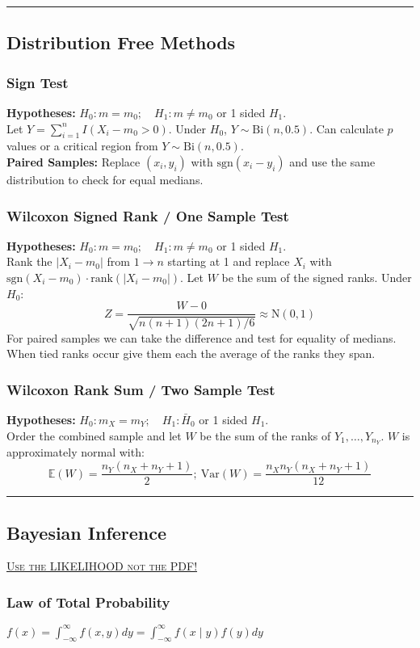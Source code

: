 \documentclass{article}
\begin{document}
\begin{multicols*}{2}
\noindent\rule{\linewidth}{0.25pt}
\subsection*{Distribution Free Methods}
\subsubsection*{Sign Test}
\textbf{Hypotheses:} $H_{0}: m = m_{0}; \quad H_{1}: m \neq m_{0}$ or 1 sided $H_{1}$.\\
Let $Y = \sum_{i=1}^{n} I(X_{i} - m_{0} > 0)$. Under $H_{0}$, $Y \sim \mbox{Bi}(n, 0.5)$. Can calculate $p$ values or a critical region from $Y \sim \mbox{Bi}(n, 0.5)$.\\
\textbf{Paired Samples:} Replace $(x_{i}, y_{i})$ with $\mbox{sgn}(x_{i} - y_{i})$ and use the same distribution to check for equal medians. 
\subsubsection*{Wilcoxon Signed Rank / One Sample Test}
\textbf{Hypotheses:} $H_{0}: m = m_{0}; \quad H_{1}: m \neq m_{0}$ or 1 sided $H_{1}$.\\
Rank the $|X_{i} - m_{0}|$ from $1 \to n$ starting at 1 and replace $X_{i}$ with $\mbox{sgn}(X_{i} - m_{0}) \cdot \mbox{rank}(|X_{i} - m_{0}|)$. Let $W$ be the sum of the signed ranks. Under $H_{0}$:
$$Z = \frac{W - 0}{\sqrt{n(n+1)(2n+1) / 6}} \approx \mbox{N}(0, 1)$$
For paired samples we can take the difference and test for equality of medians. When tied ranks occur give them each the average of the ranks they span.
\subsubsection*{Wilcoxon Rank Sum / Two Sample Test}
\textbf{Hypotheses:} $H_{0}: m_{X} = m_{Y}; \quad H_{1}: \bar{H}_{0}$ or 1 sided $H_{1}$.\\
Order the combined sample and let $W$ be the sum of the ranks of $Y_{1}, \dots, Y_{n_{Y}}$. $W$ is approximately normal with:
$$\mathbb{E}(W) = \frac{n_{Y} (n_{X} + n_{Y} + 1)}{2}; \: \mbox{Var}(W) = \frac{n_{X} n_{Y} (n_{X} + n_{Y} + 1)}{12}$$

\noindent\rule{\linewidth}{0.25pt}
\subsection*{Bayesian Inference}
\underline{\color{red} \textsc{Use the LIKELIHOOD not the PDF!}}
\subsubsection*{Law of Total Probability}
$f(x) = \int_{-\infty}^{\infty} f(x, y) dy = \int_{-\infty}^{\infty} f(x \mid y)f(y) dy$

\end{multicols*}
\end{document}
